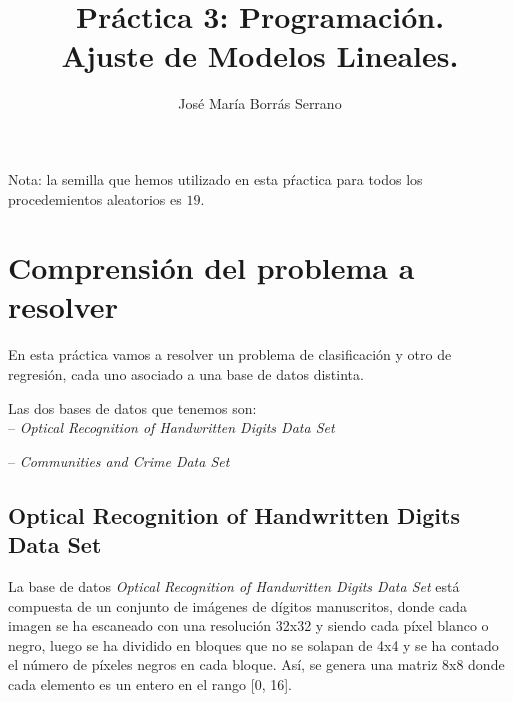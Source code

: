 \documentclass[12pt]{article}
\title{\textbf{Práctica 3: Programación.\\ Ajuste de Modelos Lineales.}}
\author{José María Borrás Serrano}
\date{}
\begin{document}
\lstset{language=Python}

\maketitle

\clearpage

\tableofcontents

\clearpage

Nota: la semilla que hemos utilizado en esta pŕactica para todos los procedemientos aleatorios es $19$.

\section{Comprensión del problema a resolver}

En esta práctica vamos a resolver un problema de clasificación y otro de regresión, cada uno asociado a una base de datos distinta.

Las dos bases de datos que tenemos son:\\

-- \textit{Optical Recognition of Handwritten Digits Data Set}

-- \textit{Communities and Crime Data Set}

\subsection{Optical Recognition of Handwritten Digits Data Set}

La base de datos \textit{Optical Recognition of Handwritten Digits Data Set} está compuesta de un conjunto de imágenes de dígitos manuscritos, donde cada imagen se ha escaneado con una resolución 32x32 y siendo cada píxel blanco o negro, luego se ha dividido en bloques que no se solapan de 4x4 y se ha contado el número de píxeles negros en cada bloque. Así, se genera una matriz 8x8 donde cada elemento es un entero en el rango [0, 16]. \\
\end{document}
